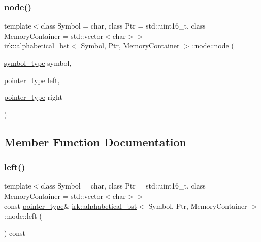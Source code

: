 \subsubsection{\texorpdfstring{node()}{node()}\hspace{0.1cm}{\footnotesize\ttfamily [2/2]}}
{\footnotesize\ttfamily template$<$class Symbol = char, class Ptr = std\+::uint16\+\_\+t, class Memory\+Container = std\+::vector$<$char$>$$>$ \\
\mbox{\hyperlink{classirk_1_1alphabetical__bst}{irk\+::alphabetical\+\_\+bst}}$<$ Symbol, Ptr, Memory\+Container $>$\+::node\+::node (\begin{DoxyParamCaption}\item[{\mbox{\hyperlink{classirk_1_1alphabetical__bst_a296ccb8fa9fa9dce3b3c3beab0a5ca28}{symbol\+\_\+type}}}]{symbol,  }\item[{\mbox{\hyperlink{classirk_1_1alphabetical__bst_ae689c05ab96a71769e24908d5c73765c}{pointer\+\_\+type}}}]{left,  }\item[{\mbox{\hyperlink{classirk_1_1alphabetical__bst_ae689c05ab96a71769e24908d5c73765c}{pointer\+\_\+type}}}]{right }\end{DoxyParamCaption})\hspace{0.3cm}{\ttfamily [inline]}}



\subsection{Member Function Documentation}
\mbox{\label{structirk_1_1alphabetical__bst_1_1node_a995b2b1dfc64e83e43c4de3585f216f5}} 
\subsubsection{\texorpdfstring{left()}{left()}}
{\footnotesize\ttfamily template$<$class Symbol = char, class Ptr = std\+::uint16\+\_\+t, class Memory\+Container = std\+::vector$<$char$>$$>$ \\
const \mbox{\hyperlink{classirk_1_1alphabetical__bst_ae689c05ab96a71769e24908d5c73765c}{pointer\+\_\+type}}\& \mbox{\hyperlink{classirk_1_1alphabetical__bst}{irk\+::alphabetical\+\_\+bst}}$<$ Symbol, Ptr, Memory\+Container $>$\+::node\+::left (\begin{DoxyParamCaption}{ }\end{DoxyParamCaption}) const\hspace{0.3cm}{\ttfamily [inline]}}

